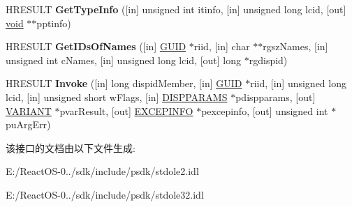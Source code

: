 \begin{DoxyCompactItemize}
\mbox{\label{interfacestdole_1_1_i_dispatch_ae2a8afd9a1063e47d74500737cda73ce}} 
H\+R\+E\+S\+U\+LT {\bfseries Get\+Type\+Info} (\mbox{[}in\mbox{]} unsigned int itinfo, \mbox{[}in\mbox{]} unsigned long lcid, \mbox{[}out\mbox{]} \hyperlink{interfacevoid}{void} $\ast$$\ast$pptinfo)
\item 
\mbox{\label{interfacestdole_1_1_i_dispatch_afd06b18f7ca3f58d934c2e316a00446e}} 
H\+R\+E\+S\+U\+LT {\bfseries Get\+I\+Ds\+Of\+Names} (\mbox{[}in\mbox{]} \hyperlink{structstdole_1_1_g_u_i_d}{G\+U\+ID} $\ast$riid, \mbox{[}in\mbox{]} char $\ast$$\ast$rgsz\+Names, \mbox{[}in\mbox{]} unsigned int c\+Names, \mbox{[}in\mbox{]} unsigned long lcid, \mbox{[}out\mbox{]} long $\ast$rgdispid)
\item 
\mbox{\label{interfacestdole_1_1_i_dispatch_a42fe38ca49ec1ec2c7494388fed9cd52}} 
H\+R\+E\+S\+U\+LT {\bfseries Invoke} (\mbox{[}in\mbox{]} long dispid\+Member, \mbox{[}in\mbox{]} \hyperlink{structstdole_1_1_g_u_i_d}{G\+U\+ID} $\ast$riid, \mbox{[}in\mbox{]} unsigned long lcid, \mbox{[}in\mbox{]} unsigned short w\+Flags, \mbox{[}in\mbox{]} \hyperlink{structstdole_1_1_d_i_s_p_p_a_r_a_m_s}{D\+I\+S\+P\+P\+A\+R\+A\+MS} $\ast$pdispparams, \mbox{[}out\mbox{]} \hyperlink{interfacevoid}{V\+A\+R\+I\+A\+NT} $\ast$pvar\+Result, \mbox{[}out\mbox{]} \hyperlink{structstdole_1_1_e_x_c_e_p_i_n_f_o}{E\+X\+C\+E\+P\+I\+N\+FO} $\ast$pexcepinfo, \mbox{[}out\mbox{]} unsigned int $\ast$pu\+Arg\+Err)
\end{DoxyCompactItemize}


该接口的文档由以下文件生成\+:\begin{DoxyCompactItemize}
\item 
E\+:/\+React\+O\+S-\/0../sdk/include/psdk/stdole2.\+idl\item 
E\+:/\+React\+O\+S-\/0../sdk/include/psdk/stdole32.\+idl\end{DoxyCompactItemize}
